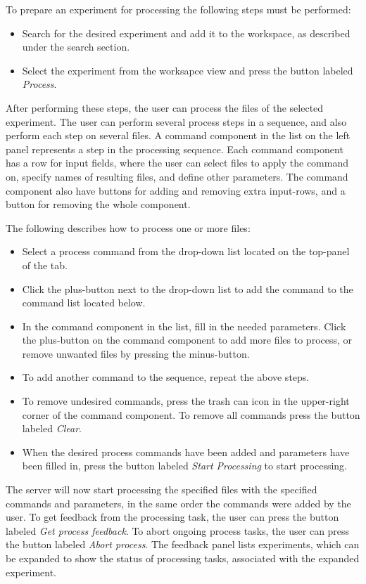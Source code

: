 To prepare an experiment for processing the following steps must be performed:
\begin{itemize}
	\item Search for the desired experiment and add it to the workspace, as described under the search section.
	\item Select the experiment from the worksapce view and press the button labeled 	\textit{Process}.
\end{itemize}
After performing these steps, the user can process the files of the selected experiment. The user can perform several process steps in a sequence, and also perform each step on several files. A command component in the list on the left panel represents a step in the processing sequence. Each command component has a row for input fields, where the user can select files to apply the command on, specify names of resulting files, and define other parameters. The command component also have buttons for adding and removing extra input-rows, and a button for removing the whole component.

The following describes how to process one or more files:
\begin{itemize}
	\item Select a process command from the drop-down list located on the top-panel of the tab.
	\item Click the plus-button next to the drop-down list to add the command to the command list located below.
	\item In the command component in the list, fill in the needed parameters. Click the plus-button on the command component to add more files to process, or remove unwanted files by pressing the minus-button.
	\item To add another command to the sequence, repeat the above steps.
	\item To remove undesired commands, press the trash can icon in the upper-right corner of the command component. To remove all commands press the button labeled \textit{Clear}.
	\item When the desired process commands have been added and parameters have been filled in, press the button labeled \textit{Start Processing} to start processing.
\end{itemize}	
	The server will now start processing the specified files with the specified commands and parameters, in the same order the commands were added by the user. To get feedback from the processing task, the user can press the button labeled \textit{Get process feedback}. To abort ongoing process tasks, the user can press the button labeled \textit{Abort process}. The feedback panel lists experiments, which can be expanded to show the status of processing tasks, associated with the expanded experiment.

